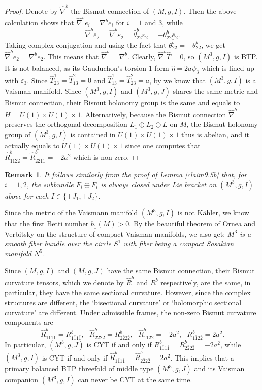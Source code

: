 \documentclass{amsart}
\numberwithin{equation}{section}
\newtheorem{remark}  [theorem]     {Remark}
\theoremstyle{definition}
\renewcommand{\1}{\mathds{1}}
\renewcommand{\>}{\rightarrow}
\begin{document}
\begin{proof}
Denote by $\hat{\nabla}^b$ the Bismut connection of $(M,g,I)$. Then the above calculation shows that $\hat{\nabla}^be_i=\nabla^be_i$ for $i=1$ and $3$, while
$$ \hat{\nabla}^b \overline{e}_2 = \hat{\nabla}^b \varepsilon_2 = \hat{\theta}^b_{22}\varepsilon_2= - \theta^b_{22} \overline{e}_2. $$
Taking complex conjugation and using the fact that $\overline{\theta^b_{22}} =- \theta^b_{22}$, we get $\hat{\nabla}^be_2 =\nabla^be_2$. This means that $\hat{\nabla}^b=\nabla^b$. Clearly, $\hat{\nabla}^b\hat{T}=0$, so $(M^3,g,I)$ is BTP. It is not balanced, as its Gauduchon's torsion $1$-form $\hat{\eta}=2a\psi_3$ which is lined up with $\varepsilon_3$. Since $\hat{T}^1_{23}=\hat{T}^2_{13}=0$ and  $\hat{T}^1_{13}=\hat{T}^2_{23}=a$, by \cite[Proposition 1.8]{ZhaoZ24} we know that $(M^3,g,I)$ is a Vaisman manifold. Since $(M^3,g,I)$ and $(M^3,g,J)$ shares the same metric and Bismut connection, their Bismut holonomy group is the same and equals to $H=U(1)\!\times\!U(1)\!\times\!1$. Alternatively, because the Bismut connection $\hat{\nabla}^b$ preserves the orthogonal decomposition $L_1\oplus L_2\oplus L$ on $M$, the Bismut holonomy group of $(M^3,g,I)$ is contained in $U(1)\!\times\!U(1)\!\times\!1$ thus is abelian, and it actually equals to $U(1)\!\times\!U(1)\!\times\!1$ since one computes that $\hat{R}^b_{1\bar{1}2\bar{2}}=\hat{R}^b_{2\bar{2}1\bar{1}}=-2a^2$ which is non-zero.
\end{proof}

\begin{remark}
It follows similarly from the proof of Lemma \ref{claim9.5b} that, for $i=1,2$, the subbundle $F_i \oplus \overline{F}_i$ is
always closed under Lie bracket on $(M^3,g,I)$ above for each $I \in \{ \pm J_1, \pm J_2\}$.
\end{remark}

Since the metric of the Vaismann manifold $(M^3,g,I)$ is not K\"ahler, we know that the first Betti number $b_1(M)>0$. By the beautiful  theorem of Ornea and Verbitsky \cite{OV03} on the structure of compact Vaisman manifolds, we also get: \emph{$M^3$ is a smooth fiber bundle over the circle $S^1$ with fiber being a compact Sasakian manifold $N^5$.}


Since $(M,g,I)$ and $(M,g,J)$ have the same Bismut connection, their Bismut curvature tensors, which we denote by $\hat{R}^b$ and $R^b$ respectively, are the same, in particular, they have the same sectional curvature. However, since the complex structures are different, the `bisectional curvature' or `holomorphic sectional curvature' are different. Under admissible frames, the non-zero Bismut curvature components are
\begin{equation}
\hat{R}^b_{1\bar{1}1\bar{1}} = R^b_{1\bar{1}1\bar{1}}, \ \ \  \hat{R}^b_{2\bar{2}2\bar{2}}=R^b_{2\bar{2}2\bar{2}}, \ \ \ \hat{R}^b_{1\bar{1}2\bar{2}}=-2a^2, \ \ \  R^b_{1\bar{1}2\bar{2}}=2a^2.
\end{equation}
In particular, $(M^3,g,J)$ is CYT if and only if $R^b_{1\bar{1}1\bar{1}}=R^b_{2\bar{2}2\bar{2}}=-2a^2$, while $(M^3,g,I)$ is CYT if and only if $\hat{R}^b_{1\bar{1}1\bar{1}}=\hat{R}^b_{2\bar{2}2\bar{2}}=2a^2$. This implies that a primary balanced BTP threefold of middle type $(M^3,g,J)$
and its Vaisman companion $(M^3,g,I)$ can never be CYT at the same time.
\end{document}
